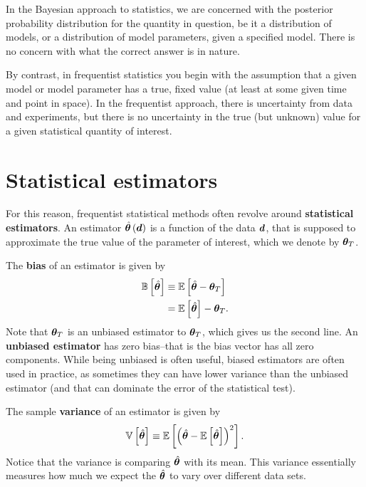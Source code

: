 In the Bayesian approach to statistics, we are concerned with the posterior probability distribution for the quantity in question, be it a distribution of models, or a distribution of model parameters, given a specified model.
There is no concern with what the correct answer is in nature.

By contrast, in frequentist statistics you begin with the assumption that a given model or model parameter has a true, fixed value (at least at some given time and point in space).
In the frequentist approach, there is uncertainty from data and experiments, but there is no uncertainty in the true (but unknown) value for a given statistical quantity of interest.

\section{Statistical estimators}


For this reason, frequentist statistical methods often revolve around \textbf{statistical estimators}.
An estimator $\hat{{\bm \theta}}\left({\bm d}\right)$ is a function of the data ${\bm d}$, that is supposed to approximate the true value of the parameter of interest, which we denote by ${\bm \theta}_T$.

The \textbf{bias} of an estimator is given by
\begin{align}
    \label{eq:estimator-bias-definition}
    \mathbb{B}\left[\hat{{\bm \theta}}\right]
    &\equiv
    \mathbb{E}\left[\hat{{\bm \theta}} - {\bm \theta}_T\right]
    \nonumber\\
    &=
    \mathbb{E}\left[\hat{{\bm \theta}}\right] - {\bm \theta}_T
    .
\end{align}
Note that ${\bm \theta}_T$ is an unbiased estimator to ${\bm \theta}_T$, which gives us the second line.
An \textbf{unbiased estimator} has zero bias--that is the bias vector has all zero components.
While being unbiased is often useful, biased estimators are often used in practice, as sometimes they can have lower variance than the unbiased estimator (and that can dominate the error of the statistical test).

The sample \textbf{variance} of an estimator is given by
\begin{align}
    \label{eq:estimator-variance-definition}
    \mathbb{V}\left[\hat{{\bm \theta}}\right]
    \equiv
    \mathbb{E}\left[\left(\hat{{\bm \theta}} - \mathbb{E}\left[\hat{{\bm \theta}}\right]\right)^2\right]
    .
\end{align}
Notice that the variance is comparing $\hat{{\bm \theta}}$ with its mean. 
This variance essentially measures how much we expect the $\hat{{\bm \theta}}$ to vary over different data sets.

